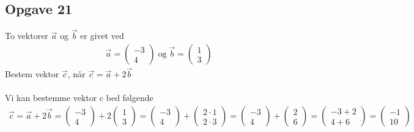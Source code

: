 \subsection{Opgave 21}

To vektorer $\Vec{a}$ og $\Vec{b}$ er givet ved
\begin{align*}
    \Vec{a} = \begin{pmatrix}-3 \\ 4\end{pmatrix}\; \text{og}\; \Vec{b} = \begin{pmatrix}1 \\ 3\end{pmatrix}
\end{align*}
Bestem vektor $\Vec{c}$, når $\Vec{c} = \Vec{a}+2\Vec{b}$\\\\

\ans
Vi kan bestemme vektor c bed følgende
\begin{align*}
    \Vec{c} = \Vec{a} + 2\Vec{b} = \begin{pmatrix}-3 \\ 4\end{pmatrix} + 2\begin{pmatrix}1 \\ 3\end{pmatrix}=\begin{pmatrix}-3 \\ 4\end{pmatrix} + \begin{pmatrix}2\cdot 1 \\ 2\cdot 3\end{pmatrix}=\begin{pmatrix}-3 \\ 4\end{pmatrix} + \begin{pmatrix}2 \\ 6\end{pmatrix}=\begin{pmatrix}-3+2 \\ 4+6\end{pmatrix} = \begin{pmatrix}-1 \\ 10 \end{pmatrix} 
\end{align*}